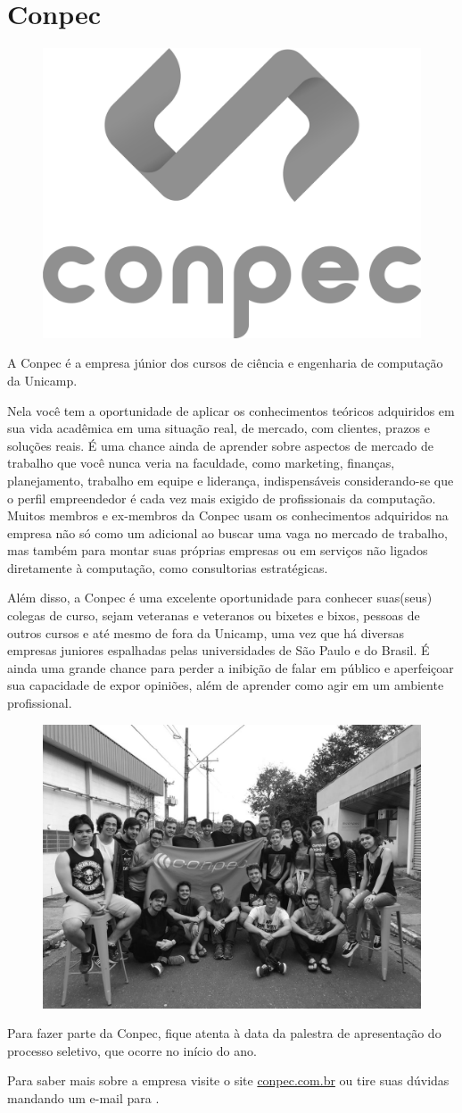 
\section{Conpec}

\begin{figure}[H]
  \centering
  \includegraphics[width=.35\textwidth]{img/alem_da_graduacao/conpec_logo.png}
\end{figure}

A Conpec é a empresa júnior dos cursos de ciência e engenharia de computação da
Unicamp.

Nela você tem a oportunidade de aplicar os conhecimentos teóricos adquiridos em
sua vida acadêmica em uma situação real, de mercado, com clientes, prazos e
soluções reais. É uma chance ainda de aprender sobre aspectos de mercado de
trabalho que você nunca veria na faculdade, como marketing, finanças,
planejamento, trabalho em equipe e liderança, indispensáveis considerando-se
que o perfil empreendedor é cada vez mais exigido de profissionais da
computação. Muitos membros e ex-membros da Conpec usam os conhecimentos
adquiridos na empresa não só como um adicional ao buscar uma vaga no mercado de
trabalho, mas também para montar suas próprias empresas ou em serviços não
ligados diretamente à computação, como consultorias estratégicas.

Além disso, a Conpec é uma excelente oportunidade para conhecer suas(seus)
colegas de curso, sejam veteranas e veteranos ou bixetes e bixos, pessoas de
outros cursos e até mesmo de fora da Unicamp, uma vez que há diversas empresas
juniores espalhadas pelas universidades de São Paulo e do Brasil. É ainda uma
grande chance para perder a inibição de falar em público e aperfeiçoar sua
capacidade de expor opiniões, além de aprender como agir em um ambiente
profissional.

\begin{figure}[H]
  \centering
  \includegraphics[width=.45\textwidth]{img/alem_da_graduacao/conpec_foto.jpg}
\end{figure}

Para fazer parte da Conpec, fique atenta à data da palestra de apresentação do
processo seletivo, que ocorre no início do ano.

Para saber mais sobre a empresa visite o site \url{conpec.com.br} ou tire suas
dúvidas mandando um e-mail para .
